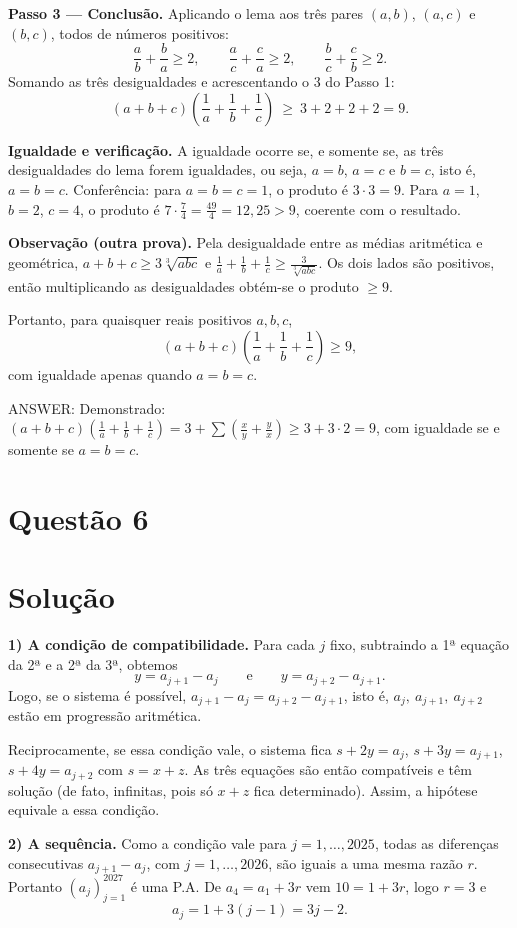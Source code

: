 \documentclass{article}%
\begin{document}
\textbf{Passo 3 --- Conclusão.} Aplicando o lema aos três pares $(a,b)$, $(a,c)$ e $(b,c)$, todos de números positivos:
\[
\frac ab+\frac ba\ge 2,\qquad \frac ac+\frac ca\ge 2,\qquad \frac bc+\frac cb\ge 2 .
\]
Somando as três desigualdades e acrescentando o $3$ do Passo 1:
\[
(a+b+c)\left(\frac1a+\frac1b+\frac1c\right)\ \ge\ 3+2+2+2=9 .
\]

\textbf{Igualdade e verificação.} A igualdade ocorre se, e somente se, as três desigualdades do lema forem igualdades, ou seja, $a=b$, $a=c$ e $b=c$, isto é, $a=b=c$. Conferência: para $a=b=c=1$, o produto é $3\cdot 3=9$. Para $a=1$, $b=2$, $c=4$, o produto é $7\cdot\frac74=\frac{49}{4}=12{,}25>9$, coerente com o resultado.

\textbf{Observação (outra prova).} Pela desigualdade entre as médias aritmética e geométrica, $a+b+c\ge 3\sqrt[3]{abc}$ e $\frac1a+\frac1b+\frac1c\ge \frac{3}{\sqrt[3]{abc}}$. Os dois lados são positivos, então multiplicando as desigualdades obtém-se o produto $\ge 9$.

Portanto, para quaisquer reais positivos $a,b,c$,
\[
(a+b+c)\left(\frac1a+\frac1b+\frac1c\right)\ge 9,
\]
com igualdade apenas quando $a=b=c$.

ANSWER: Demonstrado: $(a+b+c)\left(\frac1a+\frac1b+\frac1c\right)=3+\sum\left(\frac xy+\frac yx\right)\ge 3+3\cdot 2=9$, com igualdade se e somente se $a=b=c$.%
\newpage%
\section*{Questão 6}

\section*{Solução}

\textbf{1) A condição de compatibilidade.} Para cada $j$ fixo, subtraindo a 1ª equação da 2ª e a 2ª da 3ª, obtemos
\[
y=a_{j+1}-a_j \qquad\text{e}\qquad y=a_{j+2}-a_{j+1}.
\]
Logo, se o sistema é possível, $a_{j+1}-a_j=a_{j+2}-a_{j+1}$, isto é, $a_j,\ a_{j+1},\ a_{j+2}$ estão em progressão aritmética.

Reciprocamente, se essa condição vale, o sistema fica $s+2y=a_j$, $s+3y=a_{j+1}$, $s+4y=a_{j+2}$ com $s=x+z$. As três equações são então compatíveis e têm solução (de fato, infinitas, pois só $x+z$ fica determinado). Assim, a hipótese equivale a essa condição.

\textbf{2) A sequência.} Como a condição vale para $j=1,\dots,2025$, todas as diferenças consecutivas $a_{j+1}-a_j$, com $j=1,\dots,2026$, são iguais a uma mesma razão $r$. Portanto $(a_j)_{j=1}^{2027}$ é uma P.A. De $a_4=a_1+3r$ vem $10=1+3r$, logo $r=3$ e
\[
a_j=1+3(j-1)=3j-2 .
\]
\end{document}
